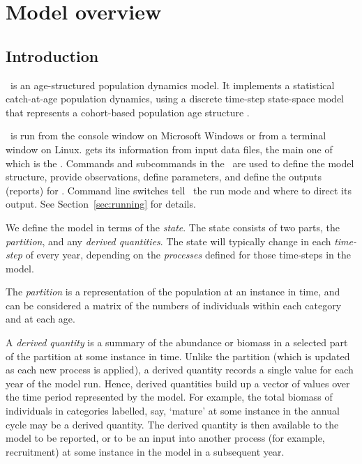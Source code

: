 \section{Model overview\label{sec:overview}}

\subsection{Introduction}
\CNAME\ is an age-structured population dynamics model. It implements a statistical catch-at-age population dynamics, using a discrete time-step state-space model that represents a cohort-based population age structure . 

\CNAME\ is run from the console window on Microsoft Windows or from a terminal window on Linux. \CNAME gets its information from input data files, the main one of which is the \emph{\config}. Commands and subcommands in the \config\ are used to define the model structure, provide observations, define parameters, and define the outputs (reports) for \CNAME. Command line switches tell \CNAME\ the run mode and where to direct its output. See Section~\ref{sec:running} for details.

We define the model in terms of the \emph{state}. The state consists of two parts, the \emph{partition}, and any \emph{derived quantities}. The state will typically change in each \emph{time-step} of every year, depending on the \emph{processes} defined for those time-steps in the model. 

The \emph{partition} is a representation of the population at an instance in time, and can be considered a matrix of the numbers of individuals within each category and at each age. 

A \emph{derived quantity} is a summary of the abundance or biomass in a selected part of the partition at some instance in time. Unlike the partition (which is updated as each new process is applied), a derived quantity records a single value for each year of the model run. Hence, derived quantities build up a vector of values over the time period represented by the model. For example, the total biomass of individuals in categories labelled, say, `mature' at some instance in the annual cycle may be a derived quantity. The derived quantity is then available to the model to be reported, or to be an input into another process (for example, recruitment) at some instance in the model in a subsequent year. 

